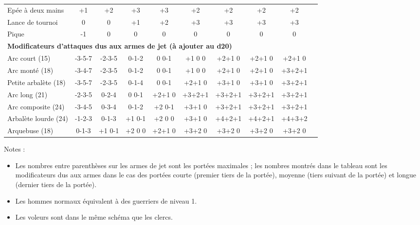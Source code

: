 \begin{tabular}{cccccccccccc}
\multicolumn{3}{l}{Epée à deux mains} & +1 & +2 & +3 & +3 & +2 & +2 & +2 & +2 \\
\multicolumn{3}{l}{Lance de tournoi}  &  0 &  0 & +1 & +2 & +3 & +3 & +3 & +3 \\
\multicolumn{3}{l}{Pique}             & -1 &  0 &  0 &  0 &  0 &  0 &  0 &  0 \\
\multicolumn{11}{l}{\textbf{Modificateurs d'attaques dus aux armes de jet (à ajouter au d20)}} \\
\multicolumn{3}{l}{Arc court (15)}       & \footnotesize-3-5-7 & \footnotesize-2-3-5 & \footnotesize0-1-2 & \footnotesize0 0-1 & \footnotesize+1 0 0 & \footnotesize+2+1 0 & \footnotesize+2+1 0 & \footnotesize+2+1 0 \\
\multicolumn{3}{l}{Arc monté (18)}       & \footnotesize-3-4-7 & \footnotesize-2-3-5 & \footnotesize0-1-2 & \footnotesize0 0-1 & \footnotesize+1 0 0 & \footnotesize+2+1 0 & \footnotesize+2+1 0 & \footnotesize+3+2+1 \\
\multicolumn{3}{l}{Petite arbalète (18)} & \footnotesize-3-5-7 & \footnotesize-2-3-5 & \footnotesize0-1-4 & \footnotesize0 0-1 & \footnotesize+2+1 0 & \footnotesize+3+1 0 & \footnotesize+3+1 0 & \footnotesize+3+2+1 \\
\multicolumn{3}{l}{Arc long (21)}        & \footnotesize-2-3-5 & \footnotesize 0-2-4 & \footnotesize0 0-1 &\footnotesize+2+1 0 & \footnotesize+3+2+1 & \footnotesize+3+2+1 & \footnotesize+3+2+1 & \footnotesize+3+2+1 \\
\multicolumn{3}{l}{Arc composite (24)}   & \footnotesize-3-4-5 & \footnotesize 0-3-4 & \footnotesize0-1-2 &\footnotesize+2 0-1 & \footnotesize+3+1 0 & \footnotesize+3+2+1 & \footnotesize+3+2+1 & \footnotesize+3+2+1 \\
\multicolumn{3}{l}{Arbalète lourde (24)} & \footnotesize-1-2-3 & \footnotesize 0-1-3 &\footnotesize+1 0-1 &\footnotesize+2 0 0 & \footnotesize+3+1 0 & \footnotesize+4+2+1 & \footnotesize+4+2+1 & \footnotesize+4+3+2 \\
\multicolumn{3}{l}{Arquebuse (18)}       &  \footnotesize0-1-3 & \footnotesize+1 0-1 &\footnotesize+2 0 0 &\footnotesize+2+1 0 & \footnotesize+3+2 0 & \footnotesize+3+2 0 & \footnotesize+3+2 0 & \footnotesize+3+2 0 \\
\end{tabular}

\newpage

Notes :

\bigskip

\begin{itemize}
\item Les nombres entre parenthèses sur les armes de jet sont les portées maximales ; les nombres montrés dans le tableau sont les modificateurs dus aux armes dans le cas des portées courte (premier tiers de la portée), moyenne (tiers suivant de la portée) et longue (dernier tiers de la portée).
\item Les hommes normaux équivalent à des guerriers de niveau 1.
\item Les voleurs sont dans le même schéma que les clercs.
\end{itemize}

\bigskip

